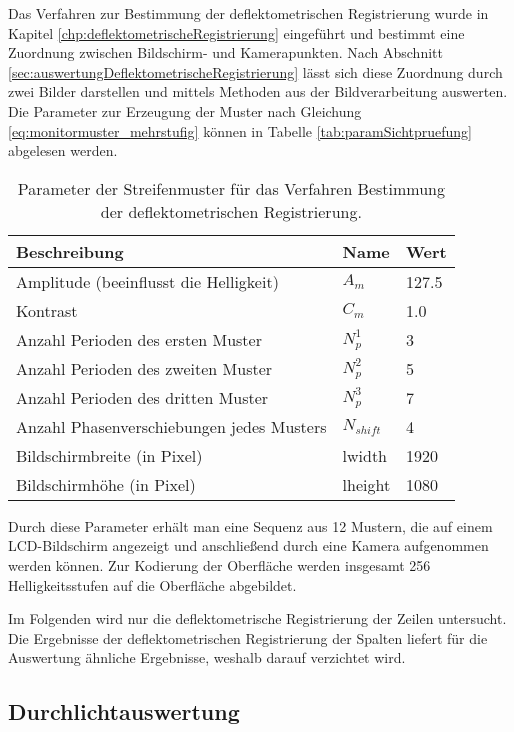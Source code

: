Das Verfahren zur Bestimmung der deflektometrischen Registrierung wurde in Kapitel \ref{chp:deflektometrischeRegistrierung} eingeführt und bestimmt eine Zuordnung zwischen Bildschirm- und Kamerapunkten.
Nach Abschnitt \ref{sec:auswertungDeflektometrischeRegistrierung} lässt sich diese Zuordnung durch zwei Bilder darstellen und mittels Methoden aus der Bildverarbeitung auswerten.
Die Parameter zur Erzeugung der Muster nach Gleichung \ref{eq:monitormuster_mehrstufig} können in Tabelle \ref{tab:paramSichtpruefung} abgelesen werden.

\begin{table}[H]
	\centering
	\begin{tabular}{lll}
	\hline 
	\textbf{Beschreibung} & \textbf{Name} & \textbf{Wert} \\ 
	\hline 
	Amplitude (beeinflusst die Helligkeit) & $A_m$ & 127.5 \\
	Kontrast & $C_m$ & 1.0 \\
	Anzahl Perioden des ersten Muster & $N_p^1$ & 3 \\ 
	Anzahl Perioden des zweiten Muster & $N_p^2$ & 5 \\ 
	Anzahl Perioden des dritten Muster & $N_p^3$ & 7 \\  
	Anzahl Phasenverschiebungen jedes Musters & $N_{shift}$ & 4 \\ 
	Bildschirmbreite (in Pixel) & \acrshort{lwidth} & 1920 \\
	Bildschirmhöhe (in Pixel) & \acrshort{lheight} & 1080 \\
	\hline 
	\end{tabular} 
	\caption{Parameter der Streifenmuster für das Verfahren \glqq Bestimmung der deflektometrischen Registrierung\grqq.}
	\label{tab:paramDeflektometrischRegistrierung}
\end{table}

\noindent
Durch diese Parameter erhält man eine Sequenz aus 12 Mustern, die auf einem LCD-Bildschirm angezeigt und anschließend durch eine Kamera aufgenommen werden können.
Zur Kodierung der Oberfläche werden insgesamt 256 Helligkeitsstufen auf die Oberfläche abgebildet.

\p
Im Folgenden wird nur die deflektometrische Registrierung der Zeilen untersucht.
Die Ergebnisse der deflektometrischen Registrierung der Spalten liefert für die Auswertung ähnliche Ergebnisse, weshalb darauf verzichtet wird.

{
	\FloatBarrier
    \subsection{Durchlichtauswertung}
    \label{sub:durchlichtAuswertungDeflektometrischeRegistrierung}
    
}

